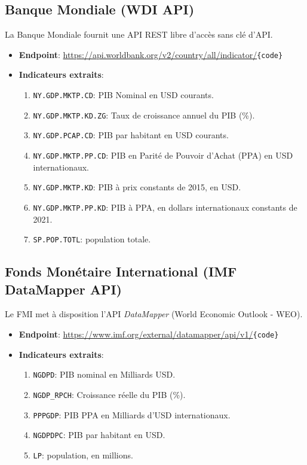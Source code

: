 \documentclass[11pt,a4paper]{article}
\begin{document}
\subsection{Banque Mondiale (WDI API)}
La Banque Mondiale fournit une API REST libre d'accès sans clé d'API.
\begin{itemize}
    \item \textbf{Endpoint}: \url{https://api.worldbank.org/v2/country/all/indicator/}\texttt{\{code\}}
    \item \textbf{Indicateurs extraits}:
    \begin{enumerate}
        \item \texttt{NY.GDP.MKTP.CD}: PIB Nominal en USD courants.
        \item \texttt{NY.GDP.MKTP.KD.ZG}: Taux de croissance annuel du PIB (\%).
        \item \texttt{NY.GDP.PCAP.CD}: PIB par habitant en USD courants.
        \item \texttt{NY.GDP.MKTP.PP.CD}: PIB en Parité de Pouvoir d'Achat (PPA) en USD internationaux.
        \item \texttt{NY.GDP.MKTP.KD}: PIB à prix constants de 2015, en USD.
        \item \texttt{NY.GDP.MKTP.PP.KD}: PIB à PPA, en dollars internationaux constants de 2021.
        \item \texttt{SP.POP.TOTL}: population totale.
    \end{enumerate}
\end{itemize}

\subsection{Fonds Monétaire International (IMF DataMapper API)}
Le FMI met à disposition l'API \textit{DataMapper} (World Economic Outlook - WEO).
\begin{itemize}
    \item \textbf{Endpoint}: \url{https://www.imf.org/external/datamapper/api/v1/}\texttt{\{code\}}
    \item \textbf{Indicateurs extraits}:
    \begin{enumerate}
        \item \texttt{NGDPD}: PIB nominal en Milliards USD.
        \item \texttt{NGDP\_RPCH}: Croissance réelle du PIB (\%).
        \item \texttt{PPPGDP}: PIB PPA en Milliards d'USD internationaux.
        \item \texttt{NGDPDPC}: PIB par habitant en USD.
        \item \texttt{LP}: population, en millions.
    \end{enumerate}
\end{itemize}
\end{document}
